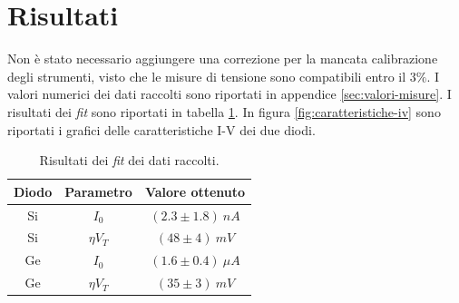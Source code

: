 \documentclass[11pt, a4paper, twoside]{article}
\begin{document}
\section{Risultati}\label{sec:risultati}
  Non è stato necessario aggiungere una correzione per la mancata calibrazione degli strumenti, visto che le misure di
  tensione sono compatibili entro il $3\%$.
  I valori numerici dei dati raccolti sono riportati in appendice \ref{sec:valori-misure}.
  I risultati dei \emph{fit} sono riportati in tabella \ref{tab:risultati-fit}.
  In figura \ref{fig:caratteristiche-iv} sono riportati i grafici delle caratteristiche I-V dei due diodi.
  \begin{table}[H]
    \centering
    \begin{tabular}[t]{ccc}
      \toprule
      Diodo& Parametro &Valore ottenuto\\
      \midrule
      Si & $I_0$ &  $(2.3 \pm 1.8)\:nA$ \\
      Si & $\eta V_T$ &  $(48 \pm 4)\:mV$ \\
      Ge & $I_0$ &  $(1.6 \pm 0.4)\:\mu A$ \\
      Ge & $\eta V_T$ &  $(35 \pm 3)\:mV$ \\
      \bottomrule
      \end{tabular}
    \caption{
      Risultati dei \emph{fit} dei dati raccolti.
    }
    \label{tab:risultati-fit}
  \end{table}
\end{document}
